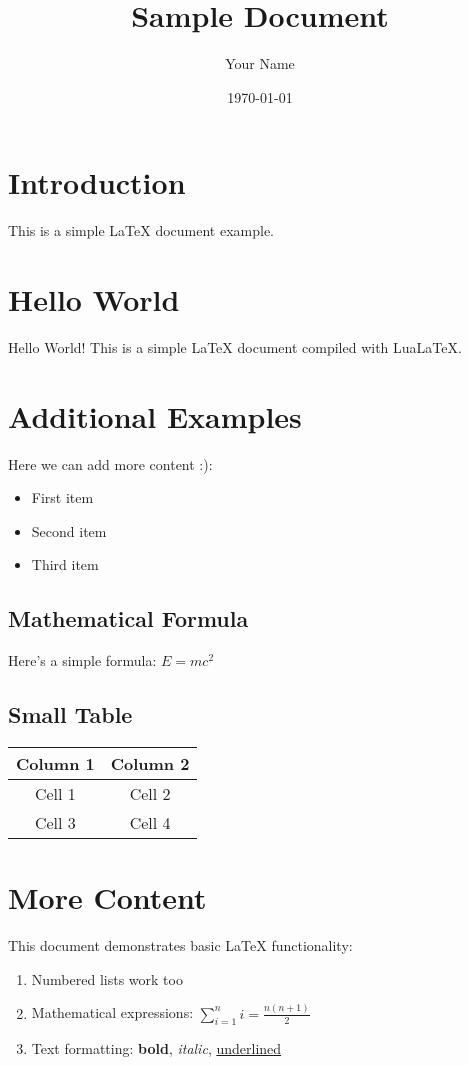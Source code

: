 \documentclass{article}
\title{Sample Document}
\author{Your Name}
\date{\today}
\begin{document}
\maketitle

\section{Introduction}
This is a simple LaTeX document example.

\section{Hello World}
Hello World! This is a simple LaTeX document compiled with LuaLaTeX.

\section{Additional Examples}
Here we can add more content :):
\begin{itemize}
    \item First item
    \item Second item
    \item Third item
\end{itemize}

\subsection{Mathematical Formula}
Here's a simple formula: $E = mc^2$

\subsection{Small Table}
\begin{center}
\begin{tabular}{|c|c|}
\hline
Column 1 & Column 2 \\
\hline
Cell 1 & Cell 2 \\
Cell 3 & Cell 4 \\
\hline
\end{tabular}
\end{center}

\section{More Content}
This document demonstrates basic LaTeX functionality:

\begin{enumerate}
    \item Numbered lists work too
    \item Mathematical expressions: $\sum_{i=1}^{n} i = \frac{n(n+1)}{2}$
    \item Text formatting: \textbf{bold}, \textit{italic}, \underline{underlined}
\end{enumerate}
\end{document}
